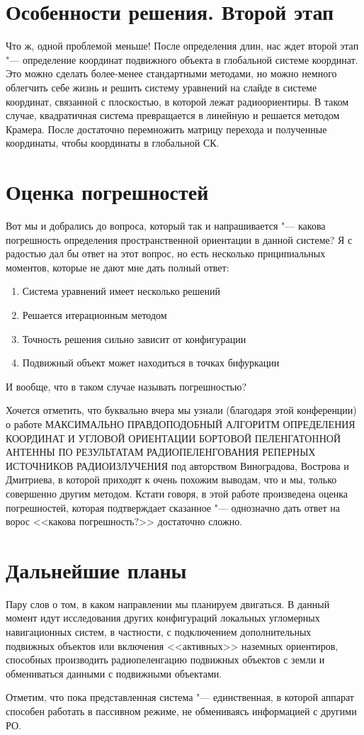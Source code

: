 \documentclass[a4paper, 14pt]{extarticle}
\begin{document}
\section{Особенности решения. Второй этап}
Что ж, одной проблемой меньше! После определения длин, нас ждет второй этап "--- определение координат
подвижного объекта в глобальной системе координат. Это можно сделать более-менее стандартными методами,
но можно немного облегчить себе жизнь и решить систему уравнений на слайде в системе координат, связанной
с плоскостью, в которой лежат радиоориентиры. В таком случае, квадратичная система превращается в линейную
и решается методом Крамера. После достаточно перемножить матрицу перехода и полученные координаты, чтобы
координаты в глобальной СК.

\section{Оценка погрешностей}
Вот мы и добрались до вопроса, который так и напрашивается "--- какова погрешность определения пространственной
ориентации в данной системе? Я с радостью дал бы ответ на этот вопрос, но есть несколько прнципиальных моментов,
которые не дают мне дать полный ответ:
\begin{enumerate}
    \item Система уравнений имеет несколько решений
    \item Решается итерационным методом
    \item Точность решения сильно зависит от конфигурации
    \item Подвижный объект может находиться в точках бифуркации
\end{enumerate}
И вообще, что в таком случае называть погрешностью?

Хочется отметить, что буквально вчера мы узнали (благодаря этой конференции) о работе
\textsc{МАКСИМАЛЬНО ПРАВДОПОДОБНЫЙ АЛГОРИТМ ОПРЕДЕЛЕНИЯ КООРДИНАТ И УГЛОВОЙ ОРИЕНТАЦИИ
БОРТОВОЙ ПЕЛЕНГАТОHНОЙ АНТЕННЫ ПО РЕЗУЛЬТАТАМ РАДИОПЕЛЕНГОВАНИЯ РЕПЕРНЫХ ИСТОЧНИКОВ РАДИОИЗЛУЧЕНИЯ}
под авторством Виноградова, Вострова и Дмитриева, в которой приходят к очень похожим выводам,
что и мы, только совершенно другим методом. Кстати говоря, в этой работе произведена оценка погрешностей,
которая подтверждает сказанное "--- однозначно дать ответ на ворос <<какова погрешность?>> достаточно сложно.

\section{Дальнейшие планы}
Пару слов о том, в каком направлении мы планируем двигаться. В данный момент идут исследования
других конфигураций локальных угломерных навигационных систем, в частности, с подключением
дополнительных подвижных объектов или включения <<активных>> наземных ориентиров, способных производить
радиопеленгацию подвижных объектов с земли и обмениваться данными с подвижными объектами.

Отметим, что пока представленная система "--- единственная, в которой аппарат способен работать в пассивном режиме,
не обмениваясь информацией с другими РО.
\end{document}
